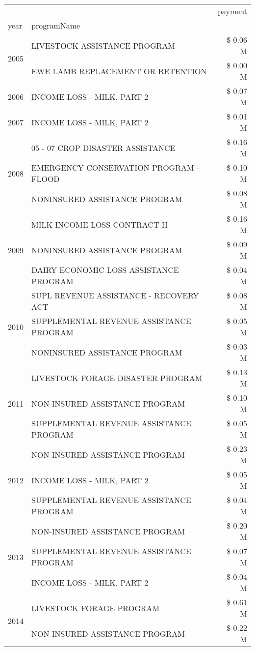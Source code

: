\begin{tabular}{llr}
\toprule
 &  & payment \\
year & programName &  \\
\midrule
\multirow[t]{2}{*}{2005} & LIVESTOCK ASSISTANCE PROGRAM & \$ 0.06 M \\
 & EWE LAMB REPLACEMENT OR RETENTION & \$ 0.00 M \\
\cline{1-3}
2006 & INCOME LOSS - MILK, PART 2 & \$ 0.07 M \\
\cline{1-3}
2007 & INCOME LOSS - MILK, PART 2 & \$ 0.01 M \\
\cline{1-3}
\multirow[t]{3}{*}{2008} & 05 - 07 CROP DISASTER ASSISTANCE & \$ 0.16 M \\
 & EMERGENCY CONSERVATION PROGRAM - FLOOD & \$ 0.10 M \\
 & NONINSURED ASSISTANCE PROGRAM & \$ 0.08 M \\
\cline{1-3}
\multirow[t]{3}{*}{2009} & MILK INCOME LOSS CONTRACT II & \$ 0.16 M \\
 & NONINSURED ASSISTANCE PROGRAM & \$ 0.09 M \\
 & DAIRY ECONOMIC LOSS ASSISTANCE PROGRAM & \$ 0.04 M \\
\cline{1-3}
\multirow[t]{3}{*}{2010} & SUPL REVENUE ASSISTANCE - RECOVERY ACT & \$ 0.08 M \\
 & SUPPLEMENTAL REVENUE ASSISTANCE PROGRAM & \$ 0.05 M \\
 & NONINSURED ASSISTANCE PROGRAM & \$ 0.03 M \\
\cline{1-3}
\multirow[t]{3}{*}{2011} & LIVESTOCK FORAGE DISASTER PROGRAM & \$ 0.13 M \\
 & NON-INSURED ASSISTANCE PROGRAM & \$ 0.10 M \\
 & SUPPLEMENTAL REVENUE ASSISTANCE PROGRAM & \$ 0.05 M \\
\cline{1-3}
\multirow[t]{3}{*}{2012} & NON-INSURED ASSISTANCE PROGRAM & \$ 0.23 M \\
 & INCOME LOSS - MILK, PART 2 & \$ 0.05 M \\
 & SUPPLEMENTAL REVENUE ASSISTANCE PROGRAM & \$ 0.04 M \\
\cline{1-3}
\multirow[t]{3}{*}{2013} & NON-INSURED ASSISTANCE PROGRAM & \$ 0.20 M \\
 & SUPPLEMENTAL REVENUE ASSISTANCE PROGRAM & \$ 0.07 M \\
 & INCOME LOSS - MILK, PART 2 & \$ 0.04 M \\
\cline{1-3}
\multirow[t]{2}{*}{2014} & LIVESTOCK FORAGE PROGRAM & \$ 0.61 M \\
 & NON-INSURED ASSISTANCE PROGRAM & \$ 0.22 M \\

\end{tabular}
